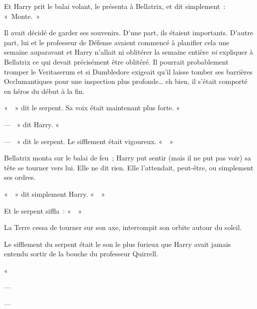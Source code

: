 Et Harry prit le balai volant, le présenta à Bellatrix, et dit simplement~: «~Monte.~»

Il avait décidé de garder ses souvenirs.
D'une part, ils étaient importants.
D'autre part, lui et le professeur de Défense avaient commencé à planifier cela une semaine auparavant et Harry n'allait ni oblitérer la semaine entière \emph{ni} expliquer à Bellatrix ce qui devait précisément être oblitéré.
Il pourrait probablement tromper le Veritaserum et si Dumbledore exigeait qu'il laisse tomber ses barrières Occlumantiques pour une inspection plus profonde… eh bien, il s'était comporté en héros du début à la fin.

«~~» dit le serpent.
Sa voix était maintenant plus forte.
«~

--- ~» dit Harry.
«~

--- ~» dit le serpent.
Le sifflement était vigoureux.
«~~»

Bellatrix monta sur le balai de feu~; Harry put sentir (mais il ne put pas voir) sa tête se tourner vers lui.
Elle ne dit rien.
Elle l'attendait, peut-être, ou simplement ses ordres.

«~~» dit simplement Harry.
«~~»

Et le serpent siffla~: «~~»

La Terre cessa de tourner sur son axe, interrompit son orbite autour du soleil.

Le sifflement du serpent était le son le plus furieux que Harry avait jamais entendu sortir de la bouche du professeur Quirrell.

«~

--- 

--- 

